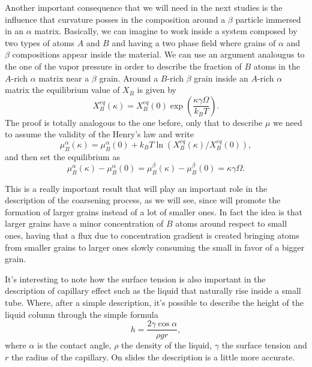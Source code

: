 Another important consequence that we will need in the next studies is the influence that curvature posses in the composition around a $\beta$ particle immersed in an $\alpha$ matrix. Basically, we can imagine to work inside a system composed by two types of atoms $A$ and $B$ and having a two phase field where grains of $\alpha$ and $\beta$ compositions appear inside the material. We can use an argument analougus to the one of the vapor pressure in order to describe the fraction of $B$ atoms in the $A$-rich $\alpha$ matrix near a $\beta$ grain.
{
    Around a $B$-rich $\beta$ grain inside an $A$-rich $\alpha$ matrix the equilibrium value of $X_B$ is given by
    \begin{equation}
        X_B^{eq}(\kappa) = X_B^{eq}(0)\exp\left( \frac{\kappa\gamma\Omega}{k_BT} \right).
    \end{equation}
}
{
    The proof is totally analogous to the one before, only that to describe $\mu$ we need to assume the validity of the Henry's law and write
    \begin{equation}
        \mu_B^\alpha(\kappa) = \mu_B^\alpha(0) + k_BT\ln\left( X_B^{eq}(\kappa)/X_B^{eq}(0) \right),
    \end{equation}
    and then set the equilibrium as
    \begin{equation}
        \mu_B^\alpha(\kappa) - \mu_B^\alpha(0) = \mu_B^\beta(\kappa) - \mu_B^\beta(0) = \kappa\gamma\Omega.
    \end{equation}
}

\noindent
This is a really important result that will play an important role in the description of the coarsening process, as we will see, since will promote the formation of larger grains instead of a lot of smaller ones. In fact the idea is that larger grains have a minor concentration of $B$ atoms around respect to small ones, having that a flux due to concentration gradient is created bringing atoms from smaller grains to larger ones slowly consuming the small in favor of a bigger grain.

\nt
{
    It's interesting to note how the surface tension is also important in the description of capillary effect such as the liquid that naturally rise inside a small tube. Where, after a simple description, it's possible to describe the height of the liquid column through the simple formula
    \begin{displaymath}
        h = \frac{2\gamma\cos\alpha}{\rho g r},
    \end{displaymath}
    where $\alpha$ is the contact angle, $\rho$ the density of the liquid, $\gamma$ the surface tension and $r$ the radius of the capillary. On slides the description is a little more accurate.
}